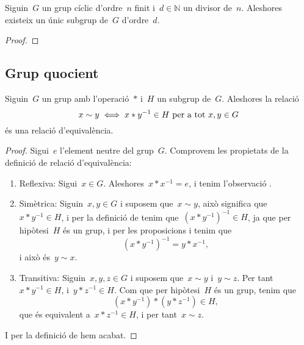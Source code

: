 \documentclass[../../main.tex]{subfiles}
\begin{document}
    \begin{proposition}
        \label{prop:existència i unicitat de subgrups cíclics d'ordres divisors}
        Siguin~\(G\) un grup cíclic d'ordre~\(n\) finit i~\(d\in\mathbb{N}\) un divisor de~\(n\).
        Aleshores existeix un únic subgrup de~\(G\) d'ordre~\(d\).
        \begin{proof}
        \end{proof}
    \end{proposition}
    \subsection{Grup quocient}
    \begin{proposition}
        \label{prop:relacio entre grups és d'equivalència}
        \label{TODO:grup quocient}
        Siguin~\(G\) un grup amb l'operació~\(\ast\) i~\(H\) un subgrup de~\(G\).
        Aleshores la relació
        \[
            x\sim y\iff x\ast y^{-1}\in H\text{ per a tot }x,y\in G
        \]
        és una relació d'equivalència.
        \begin{proof}
            Sigui~\(e\) l'element neutre del grup~\(G\).
            Comprovem les propietats de la definició de relació d'equivalència:
            \begin{enumerate}
                \item Reflexiva: Sigui~\(x\in G\).
                Aleshores~\(x\ast x^{-1}=e\), i tenim l'observació .
                \item Simètrica: Siguin~\(x,y\in G\) i suposem que~\(x\sim y\), això significa que~\(x\ast y^{-1}\in H\), i per la definició de  tenim que~\((x\ast y^{-1})^{-1}\in H\), ja que per hipòtesi~\(H\) és un grup, i per les proposicions  i  tenim que
                \[
                    (x\ast y^{-1})^{-1}=y\ast x^{-1},
                \]
                i això és~\(y\sim x\).
                \item Transitiva: Siguin~\(x,y,z\in G\) i suposem que~\(x\sim y\) i~\(y\sim z\).
                Per tant~\(x\ast y^{-1}\in H\), i~\(y\ast z^{-1}\in H\).
                Com que per hipòtesi~\(H\) és un grup, tenim que
                \[
                    (x\ast y^{-1})\ast(y\ast z^{-1})\in H,
                \]
                que és equivalent a~\(x\ast z^{-1}\in H\), i per tant~\(x\sim z\).
            \end{enumerate}
            I per la definició de  hem acabat.
        \end{proof}
    \end{proposition}
\end{document}

